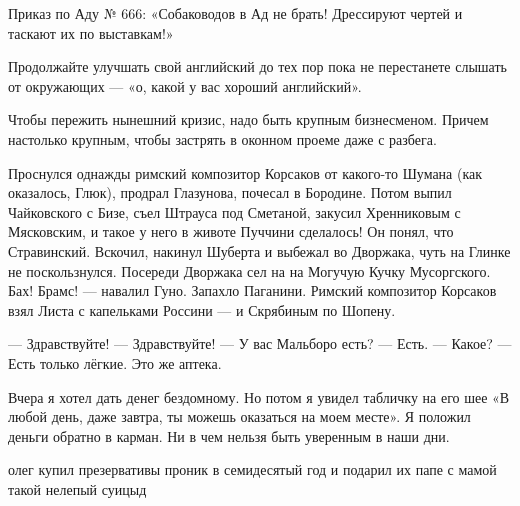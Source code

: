 Приказ по Аду № 666: «Собаководов в Ад не брать! Дрессируют чертей и таскают их по выставкам!»

Продолжайте улучшать свой английский до тех пор пока не перестанете слышать от окружающих — «о, какой у вас хороший английский».

Чтобы пережить нынешний кризис, надо быть крупным бизнесменом. Причем настолько крупным, чтобы застрять в оконном проеме даже с разбега.

Проснулся однажды римский композитор Корсаков от какого-то Шумана (как оказалось, Глюк), продрал Глазунова, почесал в Бородине. Потом выпил Чайковского с Бизе, съел Штрауса под Сметаной, закусил Хренниковым с Мясковским, и такое у него в животе Пуччини сделалось! Он понял, что Стравинский. Вскочил, накинул Шуберта и выбежал во Дворжака, чуть на Глинке не поскользнулся. Посереди Дворжака сел на на Могучую Кучку Мусоргского. Бах! Брамс! — навалил Гуно. Запахло Паганини. Римский композитор Корсаков взял Листа с капельками Россини — и Скрябиным по Шопену.

— Здравствуйте!
— Здравствуйте!
— У вас Мальборо есть?
— Есть.
— Какое?
— Есть только лёгкие. Это же аптека.

Вчера я хотел дать денег бездомному. Но потом я увидел табличку на его шее «В любой день, даже завтра, ты можешь оказаться на моем месте».
Я положил деньги обратно в карман. Ни в чем нельзя быть уверенным в наши дни.

олег купил презервативы
проник в семидесятый год
и подарил их папе с мамой
такой нелепый суицыд

